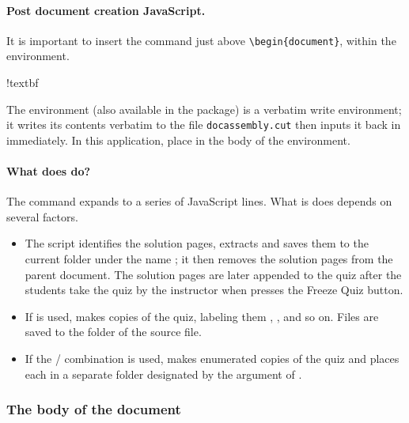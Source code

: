\documentclass{article}
\makeatletter
\def\heshe{\@ifstar{\heshei}{\global\advance\hesheCnt1\relax\heshei}}
\def\heshei{\ifodd\hesheCnt she\else he\fi}
\makeatother
\begin{document}
\paragraph*{Post document creation JavaScript.} It is important to insert the 
command just above \verb~\begin{document}~, within the 
environment.
\bVerb{}\par\vskip3pt %
\begin{dCmd}[commandchars=!~@]{\bxSize}
\begin{docassembly}
!textbf~\sadQuizzes@
\end{docassembly}
\end{dCmd}
\eVerb The  environment (also available in the
 package) is a verbatim write environment; it writes its
contents verbatim to the file \texttt{docassembly.cut} then inputs it back in
immediately. In this application, place  in the body of the
environment.

\paragraph*{What does  do?} The command expands to a series of
JavaScript lines. What is does depends on several factors.
\begin{itemize}
  \item The script identifies the solution pages, extracts and saves them
      to the current folder under the name
      ; it then removes the
      solution pages from the parent document. The solution pages are later
      appended to the quiz after the students take the quiz by the instructor
      when {\heshe} presses the \textsf{Freeze Quiz} button.
  \item If  is used,  makes
       copies of the quiz, labeling them ,
      , and so on. Files are saved to the folder of the
      source file.
  \item If the / combination is used,  makes enumerated
  copies of the quiz and places each in a separate folder designated by the argument
  of .
\end{itemize}

\subsubsection{The body of the document}
\end{document}

